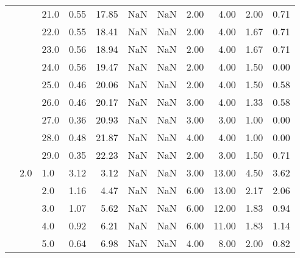 \begin{tabular}{lllrrrrrrrr}
       &     & 21.0 &      0.55 &      17.85 &               NaN &                NaN & 2.00 &   4.00 &             2.00 &                         0.71 \\
       &     & 22.0 &      0.55 &      18.41 &               NaN &                NaN & 2.00 &   4.00 &             1.67 &                         0.71 \\
       &     & 23.0 &      0.56 &      18.94 &               NaN &                NaN & 2.00 &   4.00 &             1.67 &                         0.71 \\
       &     & 24.0 &      0.56 &      19.47 &               NaN &                NaN & 2.00 &   4.00 &             1.50 &                         0.00 \\
       &     & 25.0 &      0.46 &      20.06 &               NaN &                NaN & 2.00 &   4.00 &             1.50 &                         0.58 \\
       &     & 26.0 &      0.46 &      20.17 &               NaN &                NaN & 3.00 &   4.00 &             1.33 &                         0.58 \\
       &     & 27.0 &      0.36 &      20.93 &               NaN &                NaN & 3.00 &   3.00 &             1.00 &                         0.00 \\
       &     & 28.0 &      0.48 &      21.87 &               NaN &                NaN & 4.00 &   4.00 &             1.00 &                         0.00 \\
       &     & 29.0 &      0.35 &      22.23 &               NaN &                NaN & 2.00 &   3.00 &             1.50 &                         0.71 \\
       & 2.0 & 1.0  &      3.12 &       3.12 &               NaN &                NaN & 3.00 &  13.00 &             4.50 &                         3.62 \\
       &     & 2.0  &      1.16 &       4.47 &               NaN &                NaN & 6.00 &  13.00 &             2.17 &                         2.06 \\
       &     & 3.0  &      1.07 &       5.62 &               NaN &                NaN & 6.00 &  12.00 &             1.83 &                         0.94 \\
       &     & 4.0  &      0.92 &       6.21 &               NaN &                NaN & 6.00 &  11.00 &             1.83 &                         1.14 \\
       &     & 5.0  &      0.64 &       6.98 &               NaN &                NaN & 4.00 &   8.00 &             2.00 &                         0.82 \\

\end{tabular}
